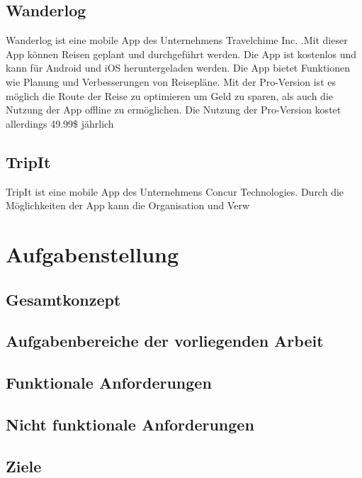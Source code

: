 \subsection{Wanderlog}
\cite{Sewell} Wanderlog ist eine mobile App des Unternehmens Travelchime Inc. .Mit dieser App können Reisen geplant und durchgeführt werden. Die App ist kostenlos und kann für Android und iOS heruntergeladen werden. Die App bietet Funktionen wie Planung und Verbesserungen von Reisepläne. Mit der Pro-Version ist es möglich die Route der Reise zu optimieren um Geld zu sparen, als auch die Nutzung der App offline zu ermöglichen. Die Nutzung der Pro-Version kostet allerdings 49.99\$ jährlich


\subsection{TripIt}
TripIt ist eine mobile App des Unternehmens Concur Technologies. Durch die Möglichkeiten der App kann die Organisation und Verw
\cite{}

\section{Aufgabenstellung}


\begin{spacing}{2}
\subsection{Gesamtkonzept}
\end{spacing}

\begin{spacing}{2}
\subsection{Aufgabenbereiche der vorliegenden Arbeit}
\end{spacing}

\begin{spacing}{2}
\subsection{Funktionale Anforderungen}
\end{spacing}

\begin{spacing}{2}
\subsection{Nicht funktionale Anforderungen}
\end{spacing}

\begin{spacing}{2}
\section{Ziele}
\end{spacing}
    
